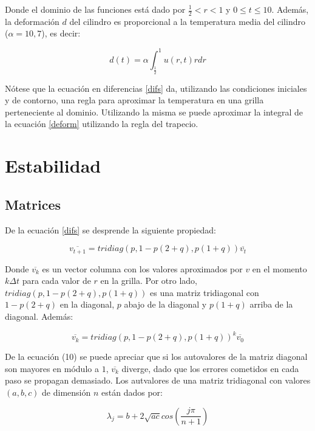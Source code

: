 ﻿\documentclass[%
final,
%
reprint,
%
notitlepage,
narroweqnarray,
inline,
twoside,
invited
]{ieee}
\begin{document}
Donde el dominio de las funciones está dado por $\frac{1}{2} < r < 1$ y $0\leq t \leq 10$. Además, 
la deformación $d$ del cilindro es proporcional a la temperatura media del cilindro ($\alpha = 10,7$), es decir:

\begin{equation}\label{deform}
d(t) = \alpha \int_{\frac{1}{2}}^{1} u(r,t)rdr
\end{equation}

Nótese que la ecuación en diferencias \eqref{difs} da, utilizando las condiciones iniciales y de contorno, 
una regla para aproximar la temperatura en una grilla perteneciente al dominio. Utilizando la misma 
se puede aproximar la integral de la ecuación \eqref{deform} utilizando la regla del trapecio.

\section{Estabilidad}


\subsection{Matrices}

De la ecuación \eqref{difs} se desprende la siguiente propiedad:

\begin{equation}
\overline{v_{t+1}} = tridiag(p,1-p(2+q),p(1+q))\overline{v_{t}}
\end{equation}

Donde $\overline{v_{k}}$ es un vector columna con los valores aproximados por $v$ en el momento $k\Delta t$ 
para cada valor de $r$ en la grilla. Por otro lado, $tridiag(p,1-p(2+q),p(1+q))$ es una matriz tridiagonal 
con $1-p(2+q)$ en la diagonal, $p$ abajo de la diagonal y $p(1+q)$ arriba de la diagonal. Además: 

\begin{equation}\label{matsa}
\overline{v_{k}} = tridiag(p,1-p(2+q),p(1+q))^k\overline{v_{0}}
\end{equation}

De la ecuación (10) se puede apreciar que si los autovalores de la matriz diagonal son 
mayores en módulo a $1$, $\overline{v_{k}}$ diverge, dado que los errores cometidos en cada paso se propagan 
demasiado. Los autvalores de una matriz tridiagonal con valores $(a,b,c)$ de dimensión $n$ están dados por:

\begin{equation}
\lambda_j = b + 2\sqrt{ac}cos(\frac{j\pi}{n+1})
\end{equation}
\end{document}
